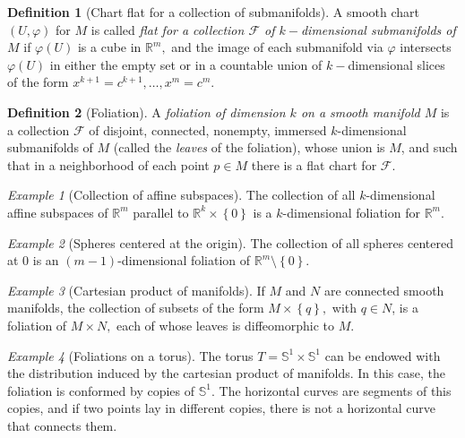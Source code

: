 \documentclass [xcolor=svgnames, t] {beamer}
\theoremstyle{definition}
\newtheorem{df}{Definition}
\theoremstyle{plain}
\theoremstyle{remark}
\newtheorem{ex}{Example}
\begin{document}
\begin{frame}
	\begin{df}[Chart flat for a collection of submanifolds]
	A smooth chart $ (U,\varphi) $ for $ M $ is called \textit{flat for a collection $ \mathcal{F} $ of $ k- $dimensional submanifolds of $ M $} if $ \varphi(U) $ is a cube in $ \mathbb{R}^m, $ and the image of each submanifold via $ \varphi $ intersects $ \varphi(U) $ in either the empty set or in a countable union of $ k- $dimensional slices of the form $ x^{k+1}=c^{k+1},\dots,x^m=c^m. $   
\end{df}

\begin{df}[Foliation]
	A \textit{foliation of dimension $ k $ on a smooth manifold $ M $} is a collection $ \mathcal{F} $ of disjoint, connected, nonempty, immersed $ k $-dimensional submanifolds of $ M $ (called the \textit{leaves} of the foliation), whose union is $ M $, and such that in a neighborhood of each point $ p\in M $ there is a flat chart for $ \mathcal{F}. $  
\end{df}
\begin{ex}[Collection of affine subspaces]
	The collection of all $ k $-dimensional affine subspaces of $ \mathbb{R}^m $ parallel to $ \mathbb{R}^k\times \left\{ 0 \right\} $ is a $ k $-dimensional foliation for $ \mathbb{R}^m. $ 
\end{ex}

\begin{ex}[Spheres centered at the origin]
	The collection of all spheres centered at $ 0 $ is an $ (m-1) $-dimensional foliation of $ \mathbb{R}^m\setminus \left\{ 0 \right\} $. 
\end{ex}

\begin{ex}[Cartesian product of manifolds]\label{ex:product_foliation}
	If $ M $ and $ N $ are connected smooth manifolds, the collection of subsets of the form $ M\times \left\{ q \right\}, $ with $ q\in N $, is a foliation of $ M\times N, $ each of whose leaves is diffeomorphic to $ M. $  	
\end{ex}

\begin{ex}[Foliations on a torus]
	The torus $ T= \mathbb{S}^1\times \mathbb{S}^1 $ can be endowed with the distribution induced by the cartesian product of manifolds. In this case, the foliation is conformed by copies of $ \mathbb{S}^1. $ The horizontal curves are segments of this copies, and if two points lay in different copies, there is not a horizontal curve that connects them.
\end{ex}


\end{frame}
\end{document}
